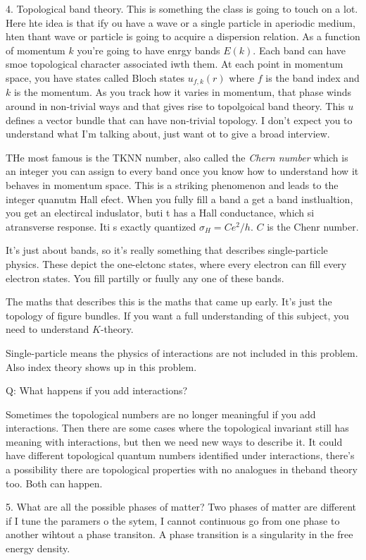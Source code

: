 4. Topological band theory.
This is something the class is going to touch on a lot.
Here hte idea is that ify ou have a wave or a single particle in aperiodic
medium, hten thant wave or particle is going to acquire a dispersion relation.
As a function of momentum $k$ you're going to have enrgy bands $E(k)$.
Each band can have smoe topological character associated iwth them.
At each point in momentum space, you have states called Bloch states
$u_{f,k}(r)$ where $f$ is the band index and $k$ is the momentum.
As you track how it varies in momentum, that phase winds around in non-trivial
ways and that gives rise to topolgoical band theory.
This $u$ defines a vector bundle that can have non-trivial topology.
I don't expect you to understand what I'm talking about,
just want ot to give a broad interview.

THe most famous is the TKNN number, also called the \emph{Chern number}
which is an integer you can assign to every band once you know how to understand
how it behaves in momentum space.
This is a striking phenomenon and leads to the integer quanutm Hall efect.
When you fully fill a band a get a band instlualtion,
you get an electircal induslator, buti t has a Hall conductance, which si
atransverse response.
Iti s exactly quantized $\sigma_H= C e^2/h$.
$C$ is the Chenr number.

It's just about bands, so it's really something that describes single-particle physics.
These depict the one-elctonc states, where every electron can fill every
electron states.
You fill partilly or fuully any one of these bands.

The maths that describes this is the maths that came up early.
It's just the topology of figure bundles.
If you want a full understanding of this subject, you need to understand
$K$-theory.

Single-particle means the physics of interactions are not included in this
problem.
Also index theory shows up in this problem.

Q: What happens if you add interactions?

Sometimes the topological numbers are no longer meaningful if you add
interactions.
Then there are some cases where the topological invariant still has meaning with
interactions, but then we need new ways to describe it.
It could have different topological quantum numbers identified under
interactions, there's a possibility there are topological properties with no
analogues in theband theory too.
Both can happen.

5. What are all the possible phases of matter?
Two phases of matter are different if I tune the paramers o the sytem, I cannot
continuous go from one phase to another wihtout a phase transiton.
A phase transition is a singularity in the free energy density.

